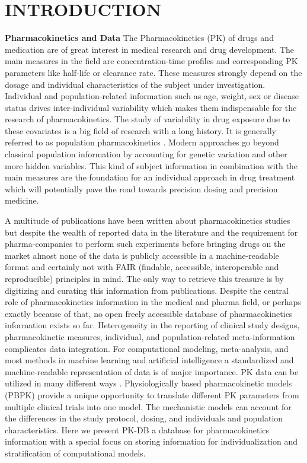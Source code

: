 \documentclass[a4,center,fleqn]{NAR}
\begin{document}
\section{INTRODUCTION}
 \textbf{Pharmacokinetics and Data} The Pharmacokinetics (PK) of drugs and medication are of great interest in medical research and drug development. The main measures in the field are concentration-time profiles and corresponding PK parameters like half-life or clearance rate. These measures strongly depend on the dosage and individual characteristics of the subject under investigation. Individual and population-related information such as age, weight, sex or disease status drives inter-individual variability \cite{Polasek2018} which makes them indispensable for the research of pharmacokinetics. The study of variability in drug exposure due to these covariates is a big field of research with a long history. It is generally referred to as population pharmacokinetics \cite{Aarons1991}. Modern approaches go beyond classical population information by accounting for genetic variation \cite{Lotsch2006} and other more hidden variables. This kind of subject information in combination with the main measures are the foundation for an individual approach in drug treatment which will potentially pave the road towards precision dosing and precision medicine. %
\par 
A multitude of publications have been written about pharmacokinetics studies but despite the wealth of reported data in the literature and the requirement for pharma-companies to perform such experiments before bringing drugs on the market almost none of the data is publicly accessible in a machine-readable format and certainly not with FAIR (findable, accessible, interoperable and reproducible) \cite{Wilkinson2016} principles in mind. The only way to retrieve this treasure is by digitizing and curating this information from publications. Despite the central role of pharmacokinetics information in the medical and pharma field, or perhaps exactly because of that, no open freely accessible database of pharmacokinetics information exists so far. Heterogeneity in the reporting of clinical study designs, pharmacokinetic measures, individual, and population-related meta-information complicates data integration. For computational modeling, meta-analysis, and most methods in machine learning and artificial intelligence a standardized and machine-readable representation of data is of major importance. PK data can be utilized in many different ways  \cite{Mould2012,Mould2013,Upton2014}. 
Physiologically based pharmacokinetic models (PBPK) provide a unique opportunity to translate different PK parameters from multiple clinical trials into one model. The mechanistic models can account for the differences in the study protocol, dosing, and individuals and population characteristics. 
Here we present PK-DB a database for pharmacokinetics information with a special focus on storing information for individualization and stratification of computational models.
\end{document}
